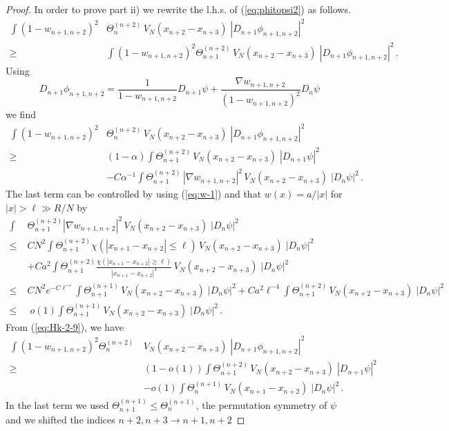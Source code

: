 \documentclass[11pt]{article}
\newcommand{\eps}{\varepsilon}
\renewcommand{\a}{\alpha}
\begin{document}
\begin{proof}
\medskip

In order to prove part ii) we rewrite the l.h.s. of
(\ref{eq:phitopsi2}) as follows.
\begin{equation}\label{eq:Hk-2-9}
\begin{split}
\int (1- w_{n+1,n+2})^2 &\Theta^{(n+2)}_n \, V_N (x_{n+2} -x_{n+3})
\; |D_{n+1} \phi_{n+1,n+2}|^2
\\ \geq \; &\int (1 - w_{n+1,n+2})^2 \Theta^{(n+2)}_{n+1} \,
V_N (x_{n+2} -x_{n+3}) \; |D_{n+1} \phi_{n+1,n+2}|^2 \,.
\end{split}
\end{equation}
Using
\[D_{n+1} \phi_{n+1,n+2} = \frac{1}{1-
w_{n+1,n+2}} D_{n+1} \psi + \frac{\nabla w_{n+1,n+2}}{(1-
w_{n+1,n+2})^2} D_n \psi \] we find
\begin{equation} \begin{split} \int (1-
w_{n+1,n+2})^2 &\Theta^{(n+2)}_n \, V_N (x_{n+2} -x_{n+3}) \;
|D_{n+1} \phi_{n+1,n+2}|^2
\\ \geq \; &(1-\a) \int \Theta^{(n+2)}_{n+1} \,
V_N (x_{n+2} -x_{n+3}) \; |D_{n+1} \psi|^2
\\ &- C \a^{-1} \int \Theta^{(n+2)}_{n+1}
\, |\nabla w_{n+1,n+2}|^2 \, V_N (x_{n+2} -x_{n+3}) \; |D_n
\psi|^2\,.
\end{split}
\end{equation}
The last term can be controlled by using (\ref{eq:w-1}) and that
$w(x)=a/|x|$ for $|x| >\ell\gg R/N$ by
\begin{equation}
\begin{split}
\int  &\Theta^{(n+2)}_{n+1} |\nabla w_{n+1,n+2}|^2 \, V_N (x_{n+2}
-x_{n+3}) \; |D_n \psi|^2 \\ \leq \; & C N^2 \int
\Theta^{(n+2)}_{n+1} \chi (|x_{n+1} - x_{n+2}| \leq \ell) \,
V_N (x_{n+2} -x_{n+3}) \; |D_n \psi|^2 \\
&+ C a^2 \int \Theta^{(n+2)}_{n+1} \frac{\chi (|x_{n+1} - x_{n+2}|
\geq \ell)}{|x_{n+1} - x_{n+2}|^4} \, V_N (x_{n+2} -x_{n+3}) \; |D_n
\psi|^2 \\ \leq \; &C N^2 e^{-C\ell^{-\eps}} \int
\Theta^{(n+1)}_{n+1} \, V_N (x_{n+2} -x_{n+3}) \; |D_n \psi|^2 + C
a^2 \ell^{-4} \int \Theta^{(n+2)}_{n+1} \,
V_N (x_{n+2} -x_{n+3}) \; |D_n \psi|^2 \, \\
\leq &\; o(1) \int \Theta^{(n+1)}_{n+1} \, V_N (x_{n+2} -x_{n+3}) \;
|D_n \psi|^2\,.
\end{split}
\end{equation}
{F}rom (\ref{eq:Hk-2-9}), we have
\begin{equation}\label{eq:Hk-2-13}
\begin{split}
\int (1- w_{n+1,n+2})^2 \Theta^{(n+2)}_n \, &V_N (x_{n+2} -x_{n+3})
\; |D_{n+1} \phi_{n+1,n+2}|^2 \\ \geq \; &(1-o(1))\int
\Theta^{(n+2)}_{n+1} \, V_N (x_{n+2} -x_{n+3}) \; |D_{n+1} \psi|^2
\\ &-o(1)\int \Theta^{(n+1)}_{n} \, V_N (x_{n+1}
-x_{n+2}) \; |D_n \psi|^2\,.
\end{split}
\end{equation}
In the last term we used $\Theta_{n+1}^{(n+1)}\leq \Theta_n^{(n+1)}$,
the permutation
symmetry of $\psi$ and we shifted the indices  $n+2, n+3 \to n+1,
n+2$
\end{proof}
\end{document}
